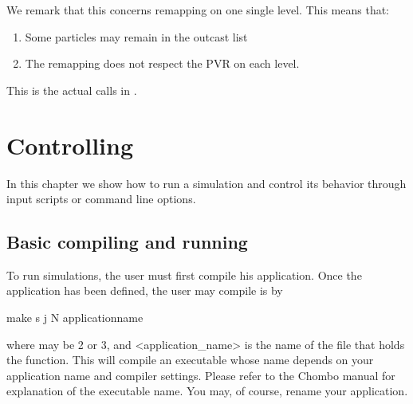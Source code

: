 \documentclass[letterpaper,10pt,english]{sphinxmanual}
\begin{document}
\begin{sphinxVerbatim}[commandchars=\\\{\},formatcom=\scriptsize]
\end{sphinxVerbatim}

We remark that this concerns remapping on one single level.
This means that:
\begin{enumerate}
%
\item {} 
Some particles may remain in the outcast list

\item {} 
The remapping does not respect the PVR on each level.

\end{enumerate}

This is the actual calls in .


\section{Controlling }
\label{\detokenize{Control:controlling-plasmac}}\label{\detokenize{Control:chap-control}}\label{\detokenize{Control::doc}}
In this chapter we show how to run a  simulation and control its behavior through input scripts or command line options.


\subsection{Basic compiling and running}
\label{\detokenize{Control:basic-compiling-and-running}}
To run simulations, the user must first compile his application. Once the application has been defined, the user may compile is by

\begin{sphinxVerbatim}[commandchars=\\\{\},formatcom=\scriptsize]
make \PYGZhy{}s \PYGZhy{}j  N \PYGZlt{}application\PYGZus{}name\PYGZgt{}
\end{sphinxVerbatim}

where  may be 2 or 3, and \textless{}application\_name\textgreater{} is the name of the file that holds the  function. This will compile an executable whose name depends on your application name and compiler settings. Please refer to the Chombo manual for explanation of the executable name. You may, of course, rename your application.
\end{document}
